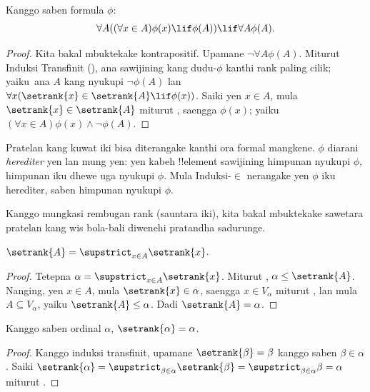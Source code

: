 \documentclass[../../../include/open-logic-section]{subfiles}
\begin{document}
\begin{thm}
Kanggo saben formula $\phi$:
\[
	\forall A((\forall x \in A)\phi(x) \lif \phi(A)) \lif \forall A \phi(A).
\]
\end{thm}

\begin{proof}
Kita bakal mbuktekake kontrapositif. Upamane
$\lnot \forall A \phi(A)$. Miturut Induksi
Transfinit (),
ana sawijining kang dudu-$\phi$ kanthi rank
paling cilik; yaiku\ ana $A$ kang nyukupi
$\lnot \phi(A)$ lan
$\forall x(\setrank{x} \in \setrank{A}
\lif \phi(x))$. Saiki yen $x \in A$, mula
$\setrank{x} \in \setrank{A}$ miturut
, saengga $\phi(x)$;
yaiku\ $(\forall x \in A)\phi(x) \land
\lnot \phi(A)$.
\end{proof}\noindent Pratelan kang kuwat iki
bisa diterangake kanthi ora formal mangkene.
$\phi$ diarani \emph{herediter} yen lan mung yen:
yen kabeh !!{element} sawijining himpunan nyukupi
$\phi$, himpunan iku dhewe uga nyukupi
$\phi$. Mula Induksi-$\in$ nerangake yen
$\phi$ iku herediter, saben himpunan nyukupi
$\phi$.

Kanggo mungkasi rembugan rank (sauntara iki),
kita bakal mbuktekake sawetara pratelan kang
wis bola-bali diwenehi pratandha sadurunge.

\begin{prop}
$\setrank{A} = \supstrict_{x \in A}\setrank{x}$.
\end{prop}

\begin{proof}
Tetepna $\alpha = \supstrict_{x \in A}\setrank{x}$.
Miturut ,
$\alpha \leq \setrank{A}$. Nanging, yen
$x \in A$, mula $\setrank{x} \in \alpha$,
saengga $x \in V_\alpha$ miturut
, lan mula
$A \subseteq V_\alpha$, yaiku
$\setrank{A} \leq \alpha$. Dadi
$\setrank{A} = \alpha$.
\end{proof}

\begin{cor}
Kanggo saben ordinal $\alpha$,
$\setrank{\alpha} = \alpha$.
\end{cor}

\begin{proof}
Kanggo induksi transfinit, upamane
$\setrank{\beta} = \beta$ kanggo saben
$\beta \in \alpha$. Saiki
$\setrank{\alpha} = \supstrict_{\beta \in
\alpha}\setrank{\beta} = \supstrict_{\beta \in
\alpha}\beta = \alpha$ miturut
.
%
\end{proof}
\end{document}
